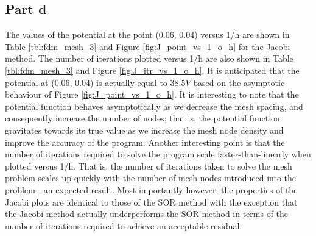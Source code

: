 \documentclass[11pt]{amsart}
\begin{document}
\subsection*{Part d}
The values of the potential at the point (0.06, 0.04) versus 1/h are shown in Table \ref{tbl:fdm_mesh_3} and Figure \ref{fig:J_point_vs_1_o_h} for the Jacobi method. The number of iterations plotted versus 1/h are also shown in Table \ref{tbl:fdm_mesh_3} and Figure \ref{fig:J_itr_vs_1_o_h}. It is anticipated that the potential at (0.06, 0.04) is actually equal to $38.5 V$ based on the asymptotic behaviour of Figure \ref{fig:J_point_vs_1_o_h}. It is interesting to note that the potential function behaves asymptotically as we decrease the mesh spacing, and consequently increase the number of nodes; that is, the potential function gravitates towards its true value as we increase the mesh node density and improve the accuracy of the program. Another interesting point is that the number of iterations required to solve the program scale faster-than-linearly when plotted versus 1/h. That is, the number of iterations taken to solve the mesh problem scales up quickly with the number of mesh nodes introduced into the problem - an expected result. Most importantly however, the properties of the Jacobi plots are identical to those of the SOR method with the exception that the Jacobi method actually underperforms the SOR method in terms of the number of iterations required to achieve an acceptable residual.
\end{document}
